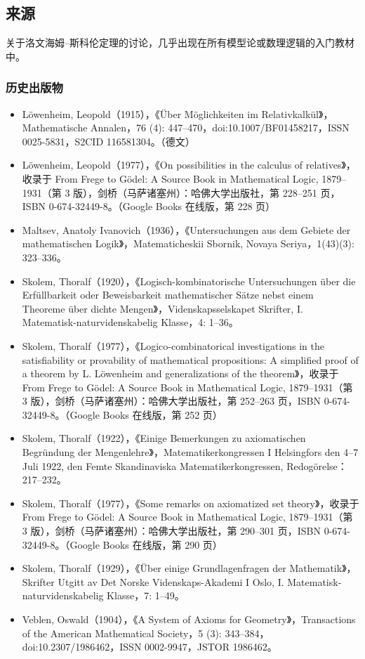\subsection{来源}
关于洛文海姆–斯科伦定理的讨论，几乎出现在所有模型论或数理逻辑的入门教材中。
\subsubsection{历史出版物}
\begin{itemize}
\item Löwenheim, Leopold（1915），《Über Möglichkeiten im Relativkalkül》，Mathematische Annalen，76 (4): 447–470，doi:10.1007/BF01458217，ISSN 0025-5831，S2CID 116581304。（德文）
\item Löwenheim, Leopold（1977），《On possibilities in the calculus of relatives》，收录于 From Frege to Gödel: A Source Book in Mathematical Logic, 1879–1931（第 3 版），剑桥（马萨诸塞州）：哈佛大学出版社，第 228–251 页，ISBN 0-674-32449-8。（Google Books 在线版，第 228 页）
\item Maltsev, Anatoly Ivanovich（1936），《Untersuchungen aus dem Gebiete der mathematischen Logik》，Matematicheskii Sbornik, Novaya Seriya，1(43)(3): 323–336。
\item Skolem, Thoralf（1920），《Logisch-kombinatorische Untersuchungen über die Erfüllbarkeit oder Beweisbarkeit mathematischer Sätze nebst einem Theoreme über dichte Mengen》，Videnskapsselskapet Skrifter, I. Matematisk-naturvidenskabelig Klasse，4: 1–36。
\item Skolem, Thoralf（1977），《Logico-combinatorical investigations in the satisfiability or provability of mathematical propositions: A simplified proof of a theorem by L. Löwenheim and generalizations of the theorem》，收录于 From Frege to Gödel: A Source Book in Mathematical Logic, 1879–1931（第 3 版），剑桥（马萨诸塞州）：哈佛大学出版社，第 252–263 页，ISBN 0-674-32449-8。（Google Books 在线版，第 252 页）
\item Skolem, Thoralf（1922），《Einige Bemerkungen zu axiomatischen Begründung der Mengenlehre》，Matematikerkongressen I Helsingfors den 4–7 Juli 1922, den Femte Skandinaviska Matematikerkongressen, Redogörelse：217–232。
\item Skolem, Thoralf（1977），《Some remarks on axiomatized set theory》，收录于 From Frege to Gödel: A Source Book in Mathematical Logic, 1879–1931（第 3 版），剑桥（马萨诸塞州）：哈佛大学出版社，第 290–301 页，ISBN 0-674-32449-8。（Google Books 在线版，第 290 页）
\item Skolem, Thoralf（1929），《Über einige Grundlagenfragen der Mathematik》，Skrifter Utgitt av Det Norske Videnskaps-Akademi I Oslo, I. Matematisk-naturvidenskabelig Klasse，7: 1–49。
\item Veblen, Oswald（1904），《A System of Axioms for Geometry》，Transactions of the American Mathematical Society，5 (3): 343–384，doi:10.2307/1986462，ISSN 0002-9947，JSTOR 1986462。
\end{itemize}
